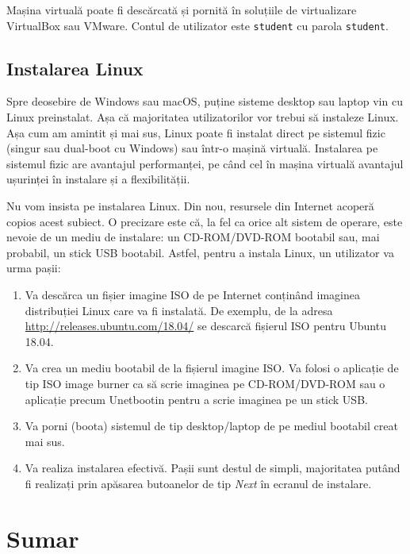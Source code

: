 Mașina virtuală poate fi descărcată și pornită în soluțiile de virtualizare VirtualBox sau VMware.
Contul de utilizator este \texttt{student} cu parola \texttt{student}.

\subsection{Instalarea Linux}
\label{sec:intro:linux-install}

Spre deosebire de Windows sau macOS, puține sisteme desktop sau laptop vin cu Linux preinstalat.
Așa că majoritatea utilizatorilor vor trebui să instaleze Linux.
Așa cum am amintit și mai sus, Linux poate fi instalat direct pe sistemul fizic (singur sau dual-boot cu Windows) sau într-o mașină virtuală.
Instalarea pe sistemul fizic are avantajul performanței, pe când cel în mașina virtuală avantajul ușurinței în instalare și a flexibilității.

Nu vom insista pe instalarea Linux.
Din nou, resursele din Internet acoperă copios acest subiect.
O precizare este că, la fel ca orice alt sistem de operare, este nevoie de un mediu de instalare: un CD-ROM/DVD-ROM bootabil sau, mai probabil, un stick USB bootabil.
Astfel, pentru a instala Linux, un utilizator va urma pașii:

\begin{enumerate}
  \item Va descărca un fișier imagine ISO de pe Internet conținând imaginea distribuției Linux care va fi instalată.
    De exemplu, de la adresa \url{http://releases.ubuntu.com/18.04/} se descarcă fișierul ISO pentru Ubuntu 18.04.
  \item Va crea un mediu bootabil de la fișierul imagine ISO.
    Va folosi o aplicație de tip ISO image burner ca să scrie imaginea pe CD-ROM/DVD-ROM sau o aplicație precum Unetbootin pentru a scrie imaginea pe un stick USB.
  \item Va porni (boota) sistemul de tip desktop/laptop de pe mediul bootabil creat mai sus.
  \item Va realiza instalarea efectivă.
    Pașii sunt destul de simpli, majoritatea putând fi realizați prin apăsarea butoanelor de tip \textit{Next} în ecranul de instalare.
\end{enumerate}

\section{Sumar}
\label{sec:intro:summary}


